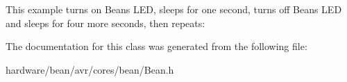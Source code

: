This example turns on Bean\textquotesingle{}s L\+E\+D, sleeps for one second, turns off Bean\textquotesingle{}s L\+E\+D and sleeps for four more seconds, then repeats\+:


\begin{DoxyCodeInclude}
\end{DoxyCodeInclude}
 

The documentation for this class was generated from the following file\+:\begin{DoxyCompactItemize}
\item 
hardware/bean/avr/cores/bean/Bean.\+h\end{DoxyCompactItemize}
